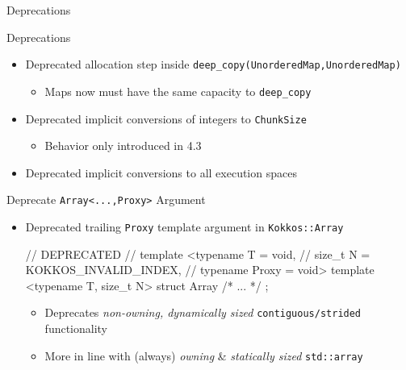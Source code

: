 

\begin{frame}[fragile]

  {\Huge Deprecations}
  
    \vspace{10pt}

\end{frame}

\begin{frame}[fragile]{Deprecations}
\begin{itemize}
\item Deprecated allocation step inside \texttt{deep\_copy(UnorderedMap,UnorderedMap)}
  \begin{itemize}
    \item[] Maps now must have the same capacity to \texttt{deep\_copy}
  \end{itemize}
\item Deprecated implicit conversions of integers to \texttt{ChunkSize}
\begin{itemize}
  \item[] Behavior only introduced in 4.3
\end{itemize}
\item Deprecated implicit conversions to all execution spaces
\end{itemize}

\end{frame}


\begin{frame}[fragile]{Deprecate \texttt{Array<...,Proxy>} Argument}
\begin {itemize}
\item Deprecated trailing \texttt{Proxy} template argument in \texttt{Kokkos::Array}
\begin{code}
// DEPRECATED
// template <typename T = void,
//           size_t N = KOKKOS_INVALID_INDEX,
//           typename Proxy = void>
template <typename T, size_t N>
struct Array { /* ... */ };
\end{code}
  \begin{itemize}
    \item Deprecates \textit{non-owning, dynamically sized} \texttt{contiguous/strided} functionality
    \item More in line with (always) \textit{owning} \& \textit{statically sized} \texttt{std::array}
  \end{itemize}
\end{itemize}
\end{frame}

